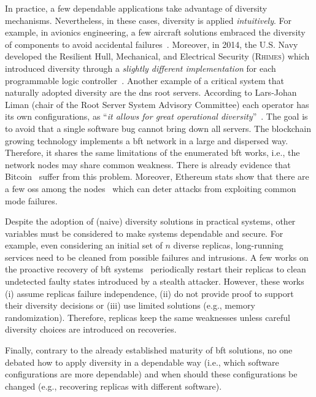 In practice, a few dependable applications take advantage of diversity mechanisms. 
Nevertheless, in these cases, diversity is applied \emph{intuitively}.
For example, in avionics engineering, a few aircraft solutions embraced the diversity of components to avoid accidental failures~\cite{Yeh:2004}.
Moreover, in 2014, the U.S. Navy developed the Resilient Hull, Mechanical, and Electrical Security (\textsc{Rhimes}) which introduced diversity through a \emph{slightly different implementation} for each programmable logic controller~\cite{rhimes}.
Another example of a critical system that naturally adopted diversity are the \gls{dns} root servers. 
According to Lars-Johan Liman (chair of the Root Server System Advisory Committee) each operator has its own configurations, as ``\emph{it allows for great operational diversity}''~\cite{dns_root}. 
The goal is to avoid that a single software bug cannot bring down all servers.
The blockchain growing technology implements a \gls{bft} network in a large and dispersed way.
Therefore, it shares the same limitations of the enumerated \gls{bft} works, i.e., the network nodes may share common weakness.
There is already evidence that Bitcoin~\cite{bitcoin} suffer from this problem.
Moreover, Ethereum stats show that there are a few \glspl{os} among the nodes~\cite{Ethstats,Ethernodes} which can deter attacks from exploiting common mode failures.


Despite the adoption of (naive) diversity solutions in practical systems, other variables must be considered to make systems dependable and secure.
For example, even considering an initial set of $n$ diverse replicas, long-running services need to be cleaned from possible failures and intrusions.
A few works on the proactive recovery of \gls{bft} systems~\cite{Castro:2002,Sousa:2010,Roeder:2010,Platania:2014,Distler:2011} periodically restart their replicas to clean undetected faulty states introduced by a stealth attacker. 
However, these works (i) assume replicas failure independence, (ii) do not provide proof to support their diversity decisions or (iii) use limited solutions (e.g., memory randomization).
Therefore, replicas keep the same weaknesses unless careful diversity choices are introduced on recoveries.


Finally, contrary to the already established maturity of \gls{bft} solutions, no one debated how to apply diversity in a dependable way (i.e., which software configurations are more dependable) and when should these configurations be changed (e.g., recovering replicas with different software).

